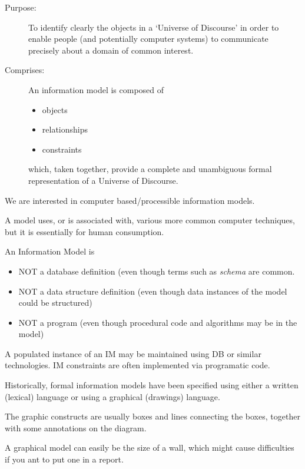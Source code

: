 
\begin{description}
\item[Purpose:] To identify clearly the objects in a `Universe of Discourse'
in order to enable people (and potentially computer systems) to communicate
precisely about a domain of common interest.

\item[Comprises:] An information model is composed of 
  \begin{itemize}
  \item objects
  \item relationships
  \item constraints
  \end{itemize}
which, taken together, provide a complete and unambiguous formal 
representation of a Universe of Discourse.
\end{description}

\begin{remarks}
\remintro


   We are interested in computer based/processible information models.

   A model uses, or is associated with, various more common computer
techniques, but it is essentially for human consumption.

\remend
\end{remarks}


An Information Model is 
\begin{itemize}
\item NOT a database definition (even though terms such as \emph{schema} are 
      common.
\item NOT a data structure definition (even though data instances of the model
      could be structured)
\item NOT a program (even though procedural code and algorithms may be in
      the model)
\end{itemize}

    A populated instance of an IM may be maintained using DB or similar 
technologies. IM constraints are often implemented via programatic code.

\begin{remarks}
\remintro


    Historically, formal information models have been specified using
either a written (lexical) language or using a graphical (drawings) 
language. 

    The graphic constructs are usually boxes and lines connecting the boxes, 
together with some annotations on the diagram. 

    A graphical model can easily be the size of a wall, which might cause
difficulties if you ant to put one in a report.


\remend
\end{remarks}


